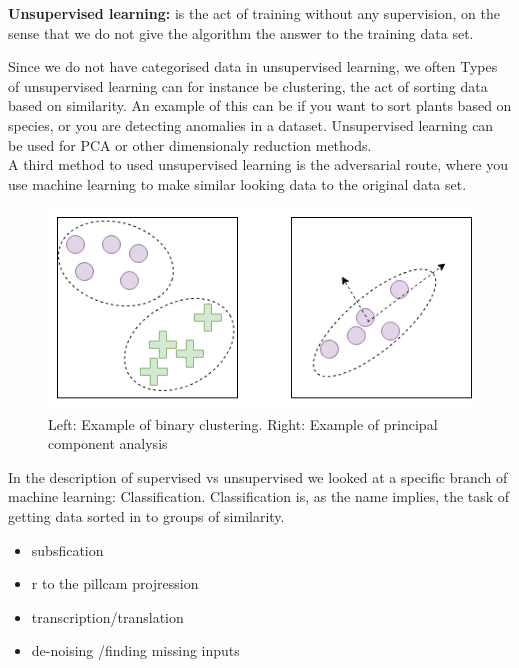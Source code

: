 	\vspace{5px}
	\textbf{Unsupervised learning:} is the act of training without any supervision, on the sense that we do not give the algorithm the answer
	to the training data set. %
	 
	Since we do not have categorised data in unsupervised learning, we often %
	Types of unsupervised learning can for instance be clustering, the act of sorting data based on similarity. An example of this can be if you want to sort plants based on species, or 
	you are detecting anomalies in a dataset.
	Unsupervised learning can be used for PCA %
	or other dimensionaly reduction methods.\\
	  
	A third method to used unsupervised learning is the adversarial route, where you use machine learning to make similar looking data to the original data set. 
	    
	\begin{figure}
	    \centering
	    \includegraphics[scale=0.5]{figures/cluster_pca.png}
	    \caption{Left: Example of binary clustering. Right: Example of principal component analysis} 
	\end{figure}

	 
	In the description of supervised vs unsupervised we looked at a specific branch of machine learning: Classification. Classification is, as the name implies, the task of 
	getting data sorted in to groups of similarity. 
	  
	  
	\begin{itemize}
	    \item subsfication
	    \item r to the pillcam projression 
	    \item transcription/translation
	    \item de-noising /finding missing inputs
	\end{itemize}
	  
